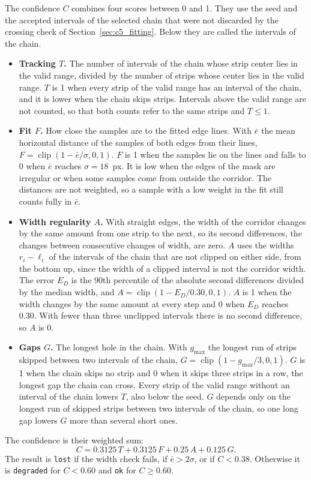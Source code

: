 The confidence $C$ combines four scores between 0 and 1. They use the seed and the accepted intervals of the selected chain that were not discarded by the crossing check of Section~\ref{sec:c5_fitting}. Below they are called the intervals of the chain.
\begin{itemize}
    \item \textbf{Tracking $T$.} The number of intervals of the chain whose strip center lies in the valid range, divided by the number of strips whose center lies in the valid range. $T$ is 1 when every strip of the valid range has an interval of the chain, and it is lower when the chain skips strips. Intervals above the valid range are not counted, so that both counts refer to the same strips and $T\leq1$.
    \item \textbf{Fit $F$.} How close the samples are to the fitted edge lines. With $\bar e$ the mean horizontal distance of the samples of both edges from their lines, $F=\operatorname{clip}(1-\bar e/\sigma,0,1)$. $F$ is 1 when the samples lie on the lines and falls to 0 when $\bar e$ reaches $\sigma=18$~px. It is low when the edges of the mask are irregular or when some samples come from outside the corridor. The distances are not weighted, so a sample with a low weight in the fit still counts fully in $\bar e$.
    \item \textbf{Width regularity $A$.} With straight edges, the width of the corridor changes by the same amount from one strip to the next, so its second differences, the changes between consecutive changes of width, are zero. $A$ uses the widths $r_i-\ell_i$ of the intervals of the chain that are not clipped on either side, from the bottom up, since the width of a clipped interval is not the corridor width. The error $E_D$ is the 90th percentile of the absolute second differences divided by the median width, and $A=\operatorname{clip}(1-E_D/0.30,0,1)$. $A$ is 1 when the width changes by the same amount at every step and 0 when $E_D$ reaches 0.30. With fewer than three unclipped intervals there is no second difference, so $A$ is 0.
    \item \textbf{Gaps $G$.} The longest hole in the chain. With $g_{\max}$ the longest run of strips skipped between two intervals of the chain, $G=\operatorname{clip}(1-g_{\max}/3,0,1)$. $G$ is 1 when the chain skips no strip and 0 when it skips three strips in a row, the longest gap the chain can cross. Every strip of the valid range without an interval of the chain lowers $T$, also below the seed. $G$ depends only on the longest run of skipped strips between two intervals of the chain, so one long gap lowers $G$ more than several short ones.
\end{itemize}
The confidence is their weighted sum:
\begin{equation}
    C=0.3125\,T+0.3125\,F+0.25\,A+0.125\,G.
    \label{eq:c5_confidence4}
\end{equation}
The result is \texttt{lost} if the width check fails, if $\bar e>2\sigma$, or if $C<0.38$. Otherwise it is \texttt{degraded} for $C<0.60$ and \texttt{ok} for $C\geq0.60$.

